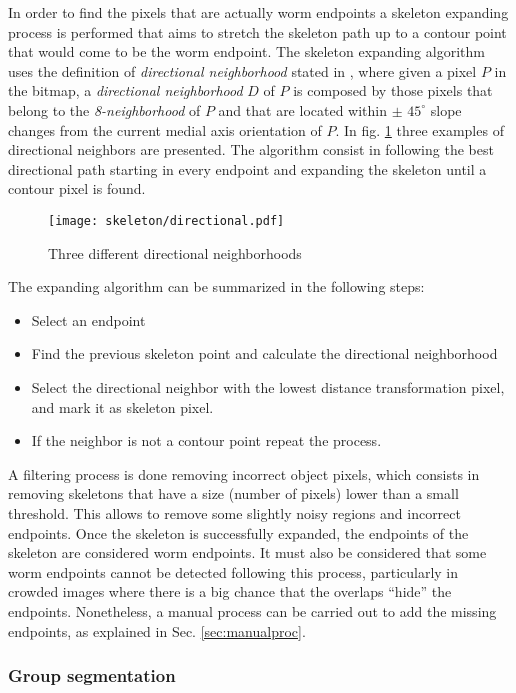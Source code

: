 In order to find the pixels that are actually worm endpoints a skeleton expanding process
is performed that aims to stretch the skeleton path up to a contour point that 
would come to be the worm endpoint. The skeleton expanding algorithm uses the definition
of \emph{directional neighborhood} stated in \cite[p.334]{maxima}, where given 
a pixel $P$ in the bitmap, a \emph{directional neighborhood} $D$ of $P$ is 
composed by those pixels that belong to the \emph{8-neighborhood} of $P$ and that
are located within $\pm$ $45^{\circ}$ slope changes from the current medial axis 
orientation of $P$. In fig. \ref{fig:directional} three examples of directional
neighbors are presented. The algorithm consist in following the best directional path
starting in every endpoint and expanding the skeleton until a contour pixel is found.
 
\begin{figure}[h t b p ! H]
 \centering
   \texttt{[image: skeleton/directional.pdf]}
 \caption{Three different directional neighborhoods}
 \label{fig:directional}
\end{figure}

The expanding algorithm can be summarized in the following steps:
\begin{itemize}
\item Select an endpoint
\item Find the previous skeleton point and calculate the directional neighborhood
\item Select the directional neighbor with the lowest distance transformation pixel,
  and mark it as skeleton pixel.
\item If the neighbor is not a contour point repeat the process.
\end{itemize}

A filtering process is done removing incorrect object pixels, which consists in
removing skeletons that have a size (number of pixels) lower than a small 
threshold. This allows to remove some slightly noisy regions and incorrect endpoints.
Once the skeleton is successfully expanded, the endpoints of the skeleton are considered
worm endpoints. 
It must also be considered that some worm endpoints cannot be detected following this 
process, particularly in crowded images where there is a big chance that the
overlaps ``hide'' the endpoints. Nonetheless, a manual process can 
be carried out to add the missing endpoints, as explained in Sec. \ref{sec:manualproc}.



\subsubsection*{Group segmentation}

